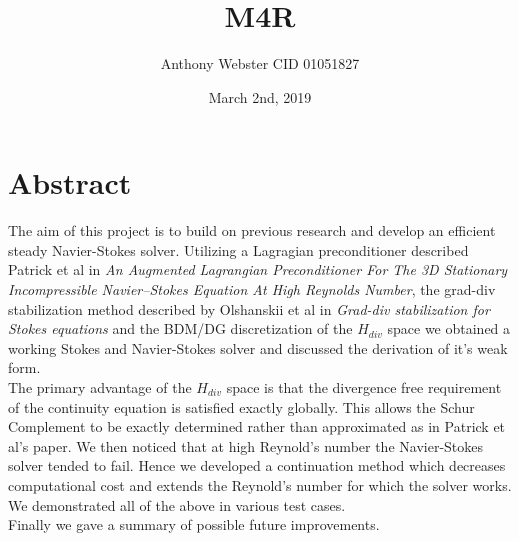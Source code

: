 \documentclass[11pt,twoside,a4paper]{article}
\begin{document}
\setcounter{secnumdepth}{4}
\title{M4R}
\date{March 2nd, 2019}
\author{Anthony Webster CID 01051827}
\maketitle
\clearpage
\section{Abstract}
The aim of this project is to build on previous research and develop an efficient steady Navier-Stokes solver. Utilizing a Lagragian preconditioner described Patrick et al in \textit{An Augmented Lagrangian Preconditioner For The 3D Stationary Incompressible Navier–Stokes Equation At High Reynolds Number}, the grad-div stabilization method described by Olshanskii et al in \textit{Grad-div stabilization for Stokes equations} and the BDM/DG discretization of the $H_{div}$ space we obtained a working Stokes and Navier-Stokes solver and discussed the derivation of it's weak form.\\
The primary advantage of the $H_{div}$ space is that the divergence free requirement of the continuity equation is satisfied exactly globally. This allows the Schur Complement to be exactly determined rather than approximated as in Patrick et al's paper.
We then noticed that at high Reynold's number the Navier-Stokes solver tended to fail. Hence we developed a continuation method which decreases computational cost and extends the Reynold's number for which the solver works.\\
We demonstrated all of the above in various test cases. \\
Finally we gave a summary of possible future improvements.
\clearpage

\tableofcontents
\clearpage
\end{document}
